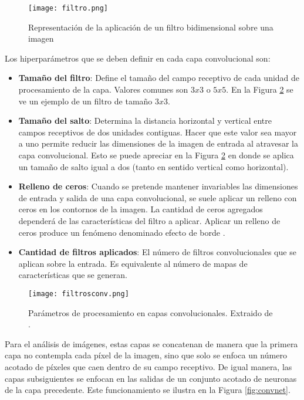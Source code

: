 \begin{figure}[H]
  \centering{}
  \texttt{[image: filtro.png]}
  \caption{Representación de la aplicación de un filtro bidimensional sobre una imagen}
  \label{fig:numerito}
\end{figure}

Los hiperparámetros que se deben definir en cada capa convolucional son: 

\begin{itemize}
\item\textbf{Tamaño del filtro}: Define el tamaño del campo receptivo de cada unidad de procesamiento de la capa. Valores comunes son $3x3$ o $5x5$. En la Figura \ref{fig:variables_conv} se ve un ejemplo de un filtro de tamaño $3x3$.

\item\textbf{Tamaño del salto}: Determina la distancia horizontal y vertical entre campos receptivos de dos unidades contiguas. Hacer que este valor sea mayor a uno permite reducir las dimensiones de la imagen de entrada al atravesar la capa convolucional. Esto se puede apreciar en la Figura \ref{fig:variables_conv} en donde se aplica un tamaño de salto igual a dos (tanto en sentido vertical como horizontal). 

\item\textbf{Relleno de ceros}: Cuando se pretende mantener invariables las dimensiones de entrada y salida de una capa convolucional, se suele aplicar un relleno con ceros en los contornos de la imagen. La cantidad de ceros agregados dependerá de las características del filtro a aplicar. Aplicar un relleno de ceros produce un fenómeno denominado efecto de borde \cite{lagartija}. 

\item\textbf{Cantidad de filtros aplicados}: El número de filtros convolucionales que se aplican sobre la entrada. Es equivalente al número de mapas de características que se generan. 

\end{itemize}

\begin{figure}[H]
  \centering{}
  \texttt{[image: filtrosconv.png]}
  \caption{Parámetros de procesamiento en capas convolucionales. Extraido de \cite{lagartija}.}
  \label{fig:variables_conv}
\end{figure}


Para el análisis de imágenes, estas capas se concatenan de manera que la primera capa no contempla cada píxel de la imagen, sino que solo se enfoca un número acotado de píxeles que caen dentro de su campo receptivo. De igual manera, las capas subsiguientes se enfocan en las salidas de un conjunto acotado de neuronas de la capa precedente. Este funcionamiento se ilustra en la Figura \ref{fig:convnet}. 


